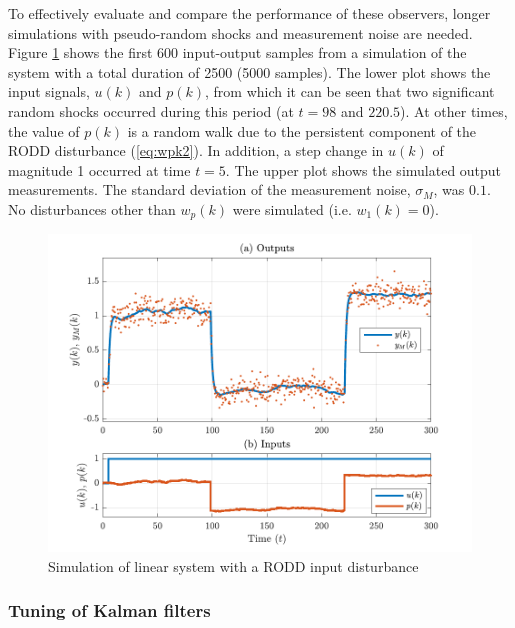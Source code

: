 To effectively evaluate and compare the performance of these observers, longer simulations with pseudo-random shocks and measurement noise are needed. Figure \ref{fig:rod-obs-sim1-ioplot} shows the first 600 input-output samples from a simulation of the system with a total duration of 2500 (5000 samples). The lower plot shows the input signals, $u(k)$ and $p(k)$, from which it can be seen that two significant random shocks occurred during this period (at $t=98$ and $220.5$). At other times, the value of $p(k)$ is a random walk due to the persistent component of the \gls{RODD} disturbance (\ref{eq:wpk2}). In addition, a step change in $u(k)$ of magnitude 1 occurred at time $t=5$. The upper plot shows the simulated output measurements. The standard deviation of the measurement noise, $\sigma_M$, was $0.1$. No disturbances other than $w_p(k)$ were simulated (i.e. $w_1(k)=0$).
\begin{figure}[htp]
	\centering
	\includegraphics[width=13cm]{images/rod_obs_sim1_all_seed_ioplot.pdf}
	\caption{Simulation of linear system with a \gls{RODD} input disturbance}
	\label{fig:rod-obs-sim1-ioplot}
\end{figure}

\subsubsection{Tuning of Kalman filters} \label{sim-obs-lin-1-KF-tuning}

